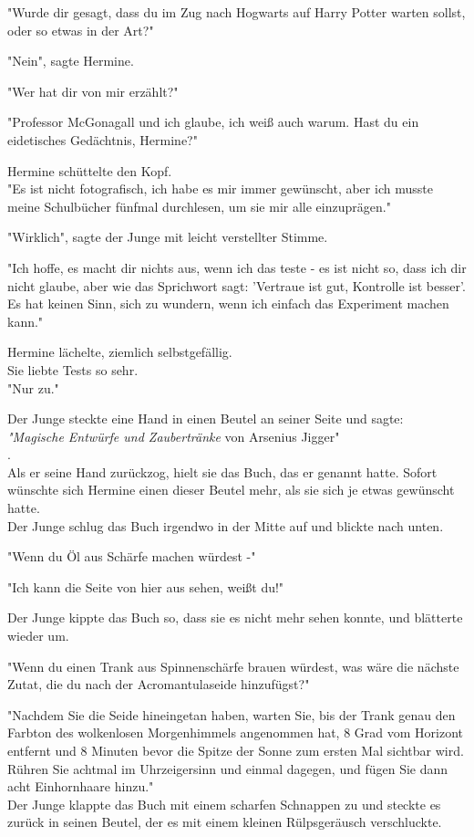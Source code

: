 {"Wurde dir gesagt, dass du im Zug nach Hogwarts auf Harry Potter warten sollst, oder so etwas in der Art?"

"Nein", sagte Hermine.

"Wer hat dir von mir erzählt?"

"Professor McGonagall und ich glaube, ich weiß auch warum. Hast du ein eidetisches Gedächtnis, Hermine?"

Hermine schüttelte den Kopf.\\ "Es ist nicht fotografisch, ich habe es mir immer gewünscht, aber ich musste meine Schulbücher fünfmal durchlesen, um sie mir alle einzuprägen."

"Wirklich", sagte der Junge mit leicht verstellter Stimme.

"Ich hoffe, es macht dir nichts aus, wenn ich das teste - es ist nicht so, dass ich dir nicht glaube, aber wie das Sprichwort sagt: 'Vertraue ist gut, Kontrolle ist besser'.\\ Es hat keinen Sinn, sich zu wundern, wenn ich einfach das Experiment machen kann."

Hermine lächelte, ziemlich selbstgefällig.\\ Sie liebte Tests so sehr.\\ "Nur zu."

Der Junge steckte eine Hand in einen Beutel an seiner Seite und sagte:\\ \emph{"Magische Entwürfe und Zaubertränke} von Arsenius Jigger"\\ .\\ Als er seine Hand zurückzog, hielt sie das Buch, das er genannt hatte. Sofort wünschte sich Hermine einen dieser Beutel mehr, als sie sich je etwas gewünscht hatte.\\ Der Junge schlug das Buch irgendwo in der Mitte auf und blickte nach unten.

"Wenn du Öl aus Schärfe machen würdest -"

"Ich kann die Seite von hier aus sehen, weißt du!"

Der Junge kippte das Buch so, dass sie es nicht mehr sehen konnte, und blätterte wieder um.

"Wenn du einen Trank aus Spinnenschärfe brauen würdest, was wäre die nächste Zutat, die du nach der Acromantulaseide hinzufügst?"

"Nachdem Sie die Seide hineingetan haben, warten Sie, bis der Trank genau den Farbton des wolkenlosen Morgenhimmels angenommen hat, 8 Grad vom Horizont entfernt und 8 Minuten bevor die Spitze der Sonne zum ersten Mal sichtbar wird.\\ Rühren Sie achtmal im Uhrzeigersinn und einmal dagegen, und fügen Sie dann acht Einhornhaare hinzu."\\ Der Junge klappte das Buch mit einem scharfen Schnappen zu und steckte es zurück in seinen Beutel, der es mit einem kleinen Rülpsgeräusch verschluckte.

}
